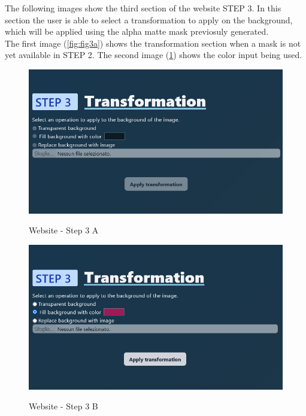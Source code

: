 \documentclass[a4paper]{article}
\begin{document}
\pagebreak

The following images show the third section
of the website \textsc{STEP 3}.
In this section the user is able to select
a transformation to apply on the background,
which will be applied using the alpha \gls{matte} mask
previosuly generated. \\
The first image (\ref{fig:fig3a}) shows the transformation
section when a mask is not yet available
in \textsc{STEP 2}. The second image (\ref{fig:fig3b})
shows the color input being used.

\begin{figure}[h]
    \centering
    \begin{minipage}[b]{0.49\textwidth}
        \includegraphics[width=\textwidth]{website/step3A.png}
        \label{fig:fig3a}
        \caption{Website - Step 3 A}
    \end{minipage}
    \hfill
    \begin{minipage}[b]{0.49\textwidth}
        \includegraphics[width=\textwidth]{website/step3B.png}
        \label{fig:fig3b}
        \caption{Website - Step 3 B}
    \end{minipage}
\end{figure}
\end{document}
